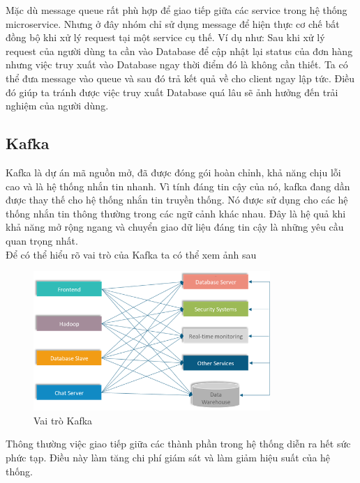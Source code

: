             Mặc dù message queue rất phù hợp để giao tiếp giữa các service trong hệ thống microservice. Nhưng ở đây nhóm chỉ sử dụng message để hiện thực cơ chế bất đồng bộ khi xử lý request tại một service cụ thế. Ví dụ như: Sau khi xử lý request của người dùng ta cần vào Database để cập nhật lại status của đơn hàng nhưng việc truy xuất vào Database ngay thời điểm đó là không cần thiết. Ta có thể đưa message vào queue và sau đó trả kết quả về cho client ngay lập tức. Điều đó giúp ta tránh được việc truy xuất Database quá lâu sẽ ảnh hưởng đến trải nghiệm của người dùng.
            
            \subsection{Kafka}
            
            Kafka\cite{kafka} là dự án mã nguồn mở, đã được đóng gói hoàn chỉnh, khả năng chịu lỗi cao và là hệ thống nhắn tin nhanh. Vì tính đáng tin cậy của nó, kafka đang dần được thay thế cho hệ thống nhắn tin truyền thống. Nó được sử dụng cho các hệ thống nhắn tin thông thường trong các ngữ cảnh khác nhau. Đây là hệ quả khi khả năng mở rộng ngang và chuyển giao dữ liệu đáng tin cậy là những yêu cầu quan trọng nhất.\\
            
            Để có thể hiểu rõ vai trò của Kafka ta có thể xem ảnh sau
            
            \begin{figure}[H]   			
            	\includegraphics[width=0.8\textwidth]{Images/Kafka1.png}
    			\centering
    			\linebreak
    			\caption{Vai trò Kafka}
            \end{figure}
            
            Thông thường việc giao tiếp giữa các thành phần trong hệ thống diễn ra hết sức phức tạp. Điều này làm tăng chi phí giám sát và làm giảm hiệu suất của hệ thống.\\
            
